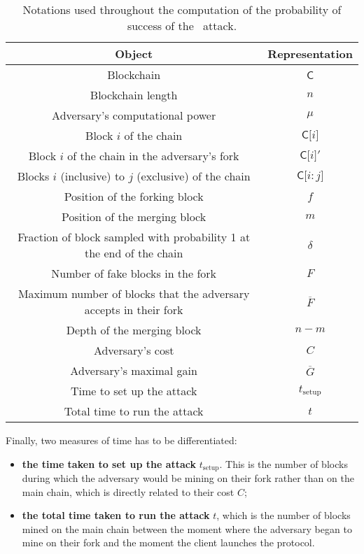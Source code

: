 \begin{table}[ht]
        \centering
        \begin{tabular}{|c|c|}
          \hline
          Object & Representation\\
          \hline
          Blockchain & \(\mathsf{C}\)\\
          \hline
          Blockchain length &  \(n\)\\
          \hline
          Adversary's computational power &  \(\mu\)\\
          \hline
          Block  \(i\) of the chain &  \(\mathsf{C[}i\mathsf{]}\)\\
          \hline
          Block \(i\) of the chain in the adversary's fork & \(\mathsf{C[}i\mathsf{]}'\)\\
          \hline
          Blocks \(i\) (inclusive) to  \(j\) (exclusive) of the chain &  \(\mathsf{C[}i\mathsf{:}j\mathsf{]}\)\\
          \hline
          Position of the forking block & \(f\)\\
          \hline
          Position of the merging block & \(m\)\\
          \hline
          Fraction of block sampled with probability 1 at the end of the chain & \(\delta\)\\
          \hline
          Number of fake blocks in the fork & \(F\)\\
          \hline
          Maximum number of blocks that the adversary accepts in their fork & \(\overline{F}\)\\
          \hline
          Depth of the merging block & \(n - m\)\\
          \hline
          Adversary's cost & \(C\)\\
          \hline
          Adversary's maximal gain & \(\overline{G}\)\\
          \hline
          Time to set up the attack & \(t_{\text{setup}}\)\\
          \hline
          Total time to run the attack & \(t\)\\
          \hline
        \end{tabular}
        \caption{Notations used throughout the computation of the probability of success of the \cs\ attack.}
        \label{table:notationsProba}
      \end{table} 

Finally, two measures of time has to be differentiated:

\begin{itemize}
    \item \textbf{the time taken to set up the attack} \(t_{\text{setup}}\). This is the number of blocks during which the adversary would be mining on their fork rather than on the main chain, which is directly related to their cost \(C\);
    \item \textbf{the total time taken to run the attack} \(t\), which is the number of blocks mined on the main chain between the moment where the adversary began to mine on their fork and the moment the client launches the protocol.
\end{itemize}

